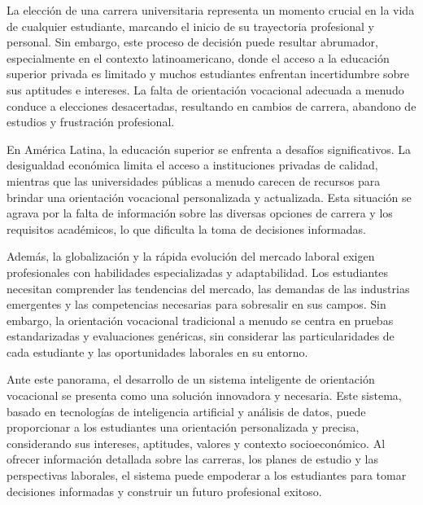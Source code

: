 La elección de una carrera universitaria representa un momento crucial en la vida de cualquier estudiante, marcando el inicio de su trayectoria profesional y personal. Sin embargo, este proceso de decisión puede resultar abrumador, especialmente en el contexto latinoamericano, donde el acceso a la educación superior privada es limitado y muchos estudiantes enfrentan incertidumbre sobre sus aptitudes e intereses. La falta de orientación vocacional adecuada a menudo conduce a elecciones desacertadas, resultando en cambios de carrera, abandono de estudios y frustración profesional.

En América Latina, la educación superior se enfrenta a desafíos significativos. La desigualdad económica limita el acceso a instituciones privadas de calidad, mientras que las universidades públicas a menudo carecen de recursos para brindar una orientación vocacional personalizada y actualizada. Esta situación se agrava por la falta de información sobre las diversas opciones de carrera y los requisitos académicos, lo que dificulta la toma de decisiones informadas.

Además, la globalización y la rápida evolución del mercado laboral exigen profesionales con habilidades especializadas y adaptabilidad. Los estudiantes necesitan comprender las tendencias del mercado, las demandas de las industrias emergentes y las competencias necesarias para sobresalir en sus campos. Sin embargo, la orientación vocacional tradicional a menudo se centra en pruebas estandarizadas y evaluaciones genéricas, sin considerar las particularidades de cada estudiante y las oportunidades laborales en su entorno.

Ante este panorama, el desarrollo de un sistema inteligente de orientación vocacional se presenta como una solución innovadora y necesaria. Este sistema, basado en tecnologías de inteligencia artificial y análisis de datos, puede proporcionar a los estudiantes una orientación personalizada y precisa, considerando sus intereses, aptitudes, valores y contexto socioeconómico. Al ofrecer información detallada sobre las carreras, los planes de estudio y las perspectivas laborales, el sistema puede empoderar a los estudiantes para tomar decisiones informadas y construir un futuro profesional exitoso.

